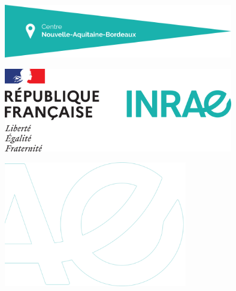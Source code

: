\makeatletter
\let\inserttitle\@title
\makeatother
\makeatletter
\let\insertauthor\@author
\makeatother
\makeatletter
\let\insertdate\@date
\makeatother


\vspace*{-4.5cm}

%

\vspace*{12.15cm}

\hspace{-2.7cm}
\includegraphics[width=10cm]{_extensions/quarto-inrae/ressources/cartouche}\par

\hspace{12cm}
\includegraphics[width=10cm]{_extensions/quarto-inrae/ressources/bloc-etat}\par

\vspace*{-2cm}

\hspace{-2.8cm}
\includegraphics[width=8cm]{_extensions/quarto-inrae/ressources/sigle-inrae}


